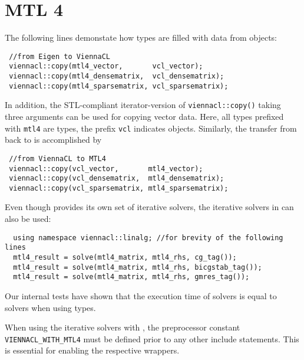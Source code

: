 \section{MTL 4}
The following lines demonstate how {\ViennaCL} types are filled with data from {\MTL} \cite{mtl4} objects:
\begin{lstlisting}
 //from Eigen to ViennaCL
 viennacl::copy(mtl4_vector,       vcl_vector);
 viennacl::copy(mtl4_densematrix,  vcl_densematrix);
 viennacl::copy(mtl4_sparsematrix, vcl_sparsematrix);
\end{lstlisting}
In addition, the STL-compliant iterator-version of \texttt{viennacl::copy()} taking three arguments can be used for copying vector data.
Here, all types prefixed with \texttt{mtl4} are {\MTL} types, the prefix \texttt{vcl} indicates {\ViennaCL} objects.
Similarly, the transfer from {\ViennaCL} back to {\MTL} is accomplished by
\begin{lstlisting}
 //from ViennaCL to MTL4
 viennacl::copy(vcl_vector,       mtl4_vector);
 viennacl::copy(vcl_densematrix,  mtl4_densematrix);
 viennacl::copy(vcl_sparsematrix, mtl4_sparsematrix);
\end{lstlisting}

Even though {\MTL} provides its own set of iterative solvers, the iterative solvers in {\ViennaCL} can also be used:
\begin{lstlisting}
  using namespace viennacl::linalg; //for brevity of the following lines
  mtl4_result = solve(mtl4_matrix, mtl4_rhs, cg_tag());
  mtl4_result = solve(mtl4_matrix, mtl4_rhs, bicgstab_tag());
  mtl4_result = solve(mtl4_matrix, mtl4_rhs, gmres_tag());
\end{lstlisting}
Our internal tests have shown that the execution time of {\MTL} solvers is equal to {\ViennaCL} solvers when using {\MTL} types.

When using the iterative solvers with {\MTL}, the preprocessor constant \texttt{VIENNACL\_WITH\_MTL4} must be defined prior to any other {\ViennaCL} include statements.
This is essential for enabling the respective wrappers.

